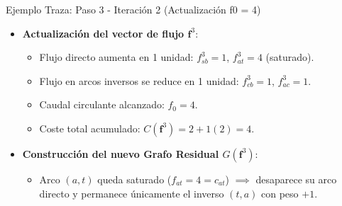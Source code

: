 \documentclass[
  ignorenonframetext,
]{beamer}
\providecommand{\tightlist}{%
  \setlength{\itemsep}{0pt}\setlength{\parskip}{0pt}}
\begin{document}
\begin{frame}{Ejemplo Traza: Paso 3 - Iteración 2 (Actualización f0 =
4)}
\label{ejemplo-traza-paso-3---iteraciuxf3n-2-actualizaciuxf3n-f0-4}
\begin{itemize}
\tightlist
\item
  \textbf{Actualización del vector de flujo \(\mathbf{f}^3\)}:

  \begin{itemize}
  \tightlist
  \item
    Flujo directo aumenta en 1 unidad: \(f_{sb}^3 = 1\),
    \(f_{at}^3 = 4\) (saturado).
  \item
    Flujo en arcos inversos se reduce en 1 unidad: \(f_{cb}^3 = 1\),
    \(f_{ac}^3 = 1\).
  \item
    Caudal circulante alcanzado: \(f_0 = 4\).
  \item
    Coste total acumulado: \(C(\mathbf{f}^3) = 2 + 1(2) = 4\).
  \end{itemize}
\item
  \textbf{Construcción del nuevo Grafo Residual \(G(\mathbf{f}^3)\)}:

  \begin{itemize}
  \tightlist
  \item
    Arco \((a,t)\) queda saturado (\(f_{at}=4=c_{at}\)) \(\implies\)
    desaparece su arco directo y permanece únicamente el inverso
    \((t,a)\) con peso \(+1\).
  \end{itemize}
\end{itemize}
\end{frame}
\end{document}

